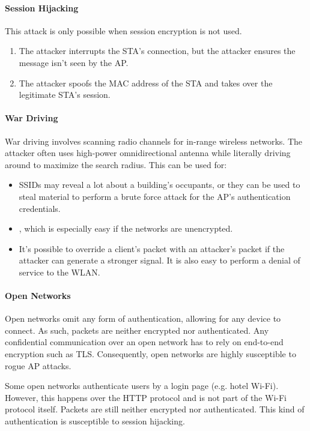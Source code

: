 \paragraph{Session Hijacking}
This attack is only possible when session encryption is not used.
\begin{enumerate}
    \item The attacker interrupts the STA's connection, but the attacker ensures the message isn't seen by the AP.
    \item The attacker spoofs the MAC address of the STA and takes over the legitimate STA's session.
\end{enumerate}

\paragraph{War Driving}
War driving involves scanning radio channels for in-range wireless networks. The attacker often uses high-power omnidirectional antenna while literally driving around to maximize the search radius. This can be used for:
\begin{itemize}
    \item {} SSIDs may reveal a lot about a building's occupants, or they can be used to steal material to perform a brute force attack for the AP's authentication credentials.
    \item {}, which is especially easy if the networks are unencrypted.
    \item {} It's possible to override a client's packet with an attacker's packet if the attacker can generate a stronger signal. It is also easy to perform a denial of service to the WLAN.
\end{itemize}

\paragraph{Open Networks}
Open networks omit any form of authentication, allowing for any device to connect. As such, packets are neither encrypted nor authenticated. Any confidential communication over an open network has to rely on end-to-end encryption such as TLS. Consequently, open networks are highly susceptible to rogue AP attacks.

Some open networks authenticate users by a login page (e.g. hotel Wi-Fi). However, this happens over the HTTP protocol and is not part of the Wi-Fi protocol itself. Packets are still neither encrypted nor authenticated. This kind of authentication is susceptible to session hijacking.


